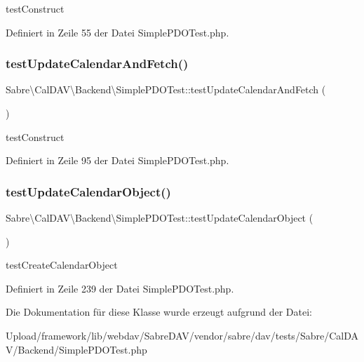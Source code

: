 test\+Construct 

Definiert in Zeile 55 der Datei Simple\+P\+D\+O\+Test.\+php.

\mbox{\label{class_sabre_1_1_cal_d_a_v_1_1_backend_1_1_simple_p_d_o_test_a8d12682ec934d07e138dc7f2577c23f0}} 
\subsubsection{\texorpdfstring{test\+Update\+Calendar\+And\+Fetch()}{testUpdateCalendarAndFetch()}}
{\footnotesize\ttfamily Sabre\textbackslash{}\+Cal\+D\+A\+V\textbackslash{}\+Backend\textbackslash{}\+Simple\+P\+D\+O\+Test\+::test\+Update\+Calendar\+And\+Fetch (\begin{DoxyParamCaption}{ }\end{DoxyParamCaption})}

test\+Construct 

Definiert in Zeile 95 der Datei Simple\+P\+D\+O\+Test.\+php.

\mbox{\label{class_sabre_1_1_cal_d_a_v_1_1_backend_1_1_simple_p_d_o_test_af9f7cfd76e8c4a3eb0d4fc2fcd94cefd}} 
\subsubsection{\texorpdfstring{test\+Update\+Calendar\+Object()}{testUpdateCalendarObject()}}
{\footnotesize\ttfamily Sabre\textbackslash{}\+Cal\+D\+A\+V\textbackslash{}\+Backend\textbackslash{}\+Simple\+P\+D\+O\+Test\+::test\+Update\+Calendar\+Object (\begin{DoxyParamCaption}{ }\end{DoxyParamCaption})}

test\+Create\+Calendar\+Object 

Definiert in Zeile 239 der Datei Simple\+P\+D\+O\+Test.\+php.



Die Dokumentation für diese Klasse wurde erzeugt aufgrund der Datei\+:\begin{DoxyCompactItemize}
\item 
Upload/framework/lib/webdav/\+Sabre\+D\+A\+V/vendor/sabre/dav/tests/\+Sabre/\+Cal\+D\+A\+V/\+Backend/Simple\+P\+D\+O\+Test.\+php\end{DoxyCompactItemize}
